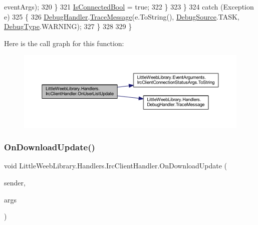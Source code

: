\begin{DoxyCode}
      eventArgs);
320                     \}
321                     \mbox{\hyperlink{class_little_weeb_library_1_1_handlers_1_1_irc_client_handler_a10457d1436c29ce92878e74579717dc0}{IsConnectedBool}} = \textcolor{keyword}{true};
322                 \}
323             \}
324             \textcolor{keywordflow}{catch} (Exception e)
325             \{
326                 \mbox{\hyperlink{class_little_weeb_library_1_1_handlers_1_1_irc_client_handler_ab50ece494948d25db1839f4d6eab038f}{DebugHandler}}.\mbox{\hyperlink{interface_little_weeb_library_1_1_handlers_1_1_i_debug_handler_a2e405bc3492e683cd3702fae125221bc}{TraceMessage}}(e.ToString(), 
      \mbox{\hyperlink{namespace_little_weeb_library_1_1_handlers_a2a6ca0775121c9c503d58aa254d292be}{DebugSource}}.TASK, \mbox{\hyperlink{namespace_little_weeb_library_1_1_handlers_ab66019ed40462876ec4e61bb3ccb0a62}{DebugType}}.WARNING);
327             \}
328            
329         \}
\end{DoxyCode}
Here is the call graph for this function\+:\nopagebreak
\begin{figure}[H]
\begin{center}
\leavevmode
\includegraphics[width=350pt]{class_little_weeb_library_1_1_handlers_1_1_irc_client_handler_a8ffa9ba31b96d32a4c1fdafc04afaf5e_cgraph}
\end{center}
\end{figure}
\mbox{\label{class_little_weeb_library_1_1_handlers_1_1_irc_client_handler_afef5cc2f76989366cb52ffa7d5a78752}} 
\subsubsection{\texorpdfstring{On\+Download\+Update()}{OnDownloadUpdate()}}
{\footnotesize\ttfamily void Little\+Weeb\+Library.\+Handlers.\+Irc\+Client\+Handler.\+On\+Download\+Update (\begin{DoxyParamCaption}\item[{object}]{sender,  }\item[{D\+C\+C\+Event\+Args}]{args }\end{DoxyParamCaption})\hspace{0.3cm}{\ttfamily [private]}}



